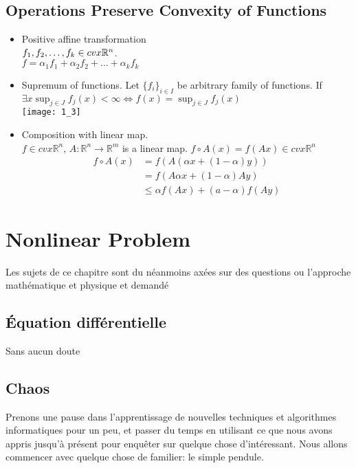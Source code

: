 \documentclass[11pt,fleqn]{book} %
\def\R{\mathbb{R}}
\begin{document}
\section{Operations Preserve Convexity of Functions}
\begin{itemize}
\item Positive affine transformation \\
$f_1,f_2,\ldots,f_k \in \space cvx \R^n$.\\
$f = \alpha_1 f_1 + \alpha_2 f_2 + \ldots + \alpha_k f_k$
\item Supremum of functions. Let $\{ f_i \}_{i \in I}$ be arbitrary family of functions. If $\exists x \sup_{j \in J} f_j(x) < \infty \Leftrightarrow f(x) = \sup_{j \in J} f_j(x) $\\
\texttt{[image: 1\_3]}
\item Composition with linear map.\\
$f \in cvx \R^n$, $A:\R^n \to \R^m$ is a linear map.
$f \circ A (x) = f(Ax) \in cvx \R^n$\\
\begin{align*}
f \circ A (x) & = f(A(\alpha x + (1-\alpha) y)) \\
& = f(A \alpha x + (1-\alpha) A y) \\
& \le \alpha f(Ax) + (a - \alpha) f(Ay)
\end{align*}
\end{itemize}


\chapter{Nonlinear Problem}
Les sujets de ce chapitre sont du néanmoins axées sur des questions
ou l'approche mathématique et physique et demandé 

\section{Équation différentielle}
Sans aucun doute 
\section{Chaos}
Prenons une pause dans l'apprentissage de nouvelles techniques et algorithmes informatiques
pour un peu, et passer du temps en utilisant ce que nous avons appris jusqu'à présent pour enquêter sur quelque chose d'intéressant. Nous allons commencer avec quelque chose de familier: le simple pendule.
\end{document}
